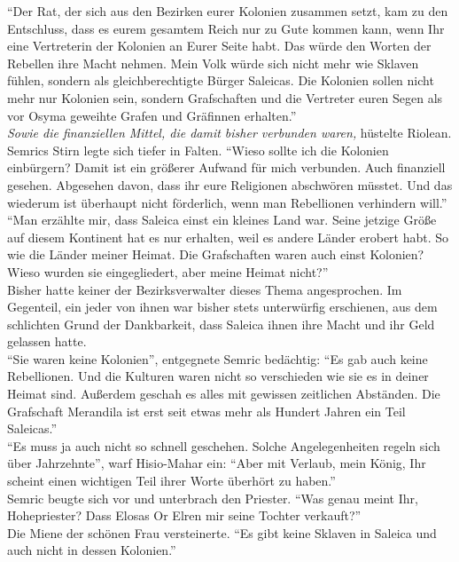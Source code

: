 ``Der Rat, der sich aus den Bezirken eurer Kolonien zusammen setzt, kam zu den Entschluss, dass es 
eurem gesamtem Reich nur zu Gute kommen kann, wenn Ihr eine Vertreterin der Kolonien an Eurer Seite 
habt. Das würde den Worten der Rebellen ihre Macht nehmen. Mein Volk würde sich nicht mehr wie 
Sklaven fühlen, sondern als gleichberechtigte Bürger Saleicas. Die Kolonien sollen nicht mehr nur 
Kolonien sein, sondern Grafschaften und die Vertreter euren Segen als vor Osyma geweihte Grafen und 
Gräfinnen erhalten.''\\
\textit{Sowie die finanziellen Mittel, die damit bisher verbunden waren,} hüstelte Riolean.\\
Semrics Stirn legte sich tiefer in Falten. ``Wieso sollte ich die Kolonien einbürgern? Damit ist 
ein größerer Aufwand für mich verbunden. Auch finanziell gesehen. Abgesehen davon, dass ihr eure 
Religionen abschwören müsstet. Und das wiederum ist überhaupt nicht förderlich, wenn man 
Rebellionen verhindern will.''\\
``Man erzählte mir, dass Saleica einst ein kleines Land war. Seine jetzige Größe auf diesem 
Kontinent hat es nur erhalten, weil es andere Länder erobert habt. So wie die Länder meiner Heimat. 
Die Grafschaften waren auch einst Kolonien? Wieso wurden sie eingegliedert, aber meine Heimat 
nicht?''\\
Bisher hatte keiner der Bezirksverwalter dieses Thema angesprochen. Im Gegenteil, ein jeder von 
ihnen war bisher stets unterwürfig erschienen, aus dem schlichten Grund der Dankbarkeit, dass 
Saleica ihnen ihre Macht und ihr Geld gelassen hatte.\\
``Sie waren keine Kolonien'', entgegnete Semric bedächtig: ``Es gab auch keine Rebellionen. Und die 
Kulturen waren nicht so verschieden wie sie es in deiner Heimat sind. Außerdem geschah es alles mit 
gewissen zeitlichen Abständen. Die Grafschaft Merandila ist erst seit etwas mehr als Hundert Jahren 
ein Teil Saleicas.''\\
``Es muss ja auch nicht so schnell geschehen. Solche Angelegenheiten regeln sich über Jahrzehnte'', 
warf Hisio-Mahar ein: ``Aber mit Verlaub, mein König, Ihr scheint einen wichtigen Teil ihrer Worte 
überhört zu haben.''\\
Semric beugte sich vor und unterbrach den Priester. ``Was genau meint Ihr, Hohepriester? Dass 
Elosas Or Elren mir seine Tochter verkauft?''\\
Die Miene der schönen Frau versteinerte. ``Es gibt keine Sklaven in Saleica und auch nicht in 
dessen Kolonien.''\\
